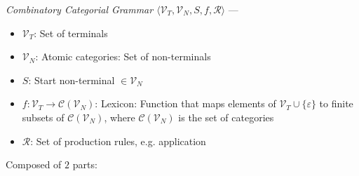 \emph{Combinatory Categorial Grammar $\langle \mathcal{V}_T, \mathcal{V}_N, S, f, \mathcal{R} \rangle$} --- 
\begin{itemize}
    \item $\mathcal{V}_T$: Set of terminals
    \item $\mathcal{V}_N$: Atomic categories: Set of non-terminals
    \item $S$: Start non-terminal $\in \mathcal{V}_N$
    \item $f: \mathcal{V}_T \to \mathcal{C}(\mathcal{V}_N)$: Lexicon: Function that maps elements of $\mathcal{V}_T \cup \{\varepsilon\}$ to finite subsets of $\mathcal{C}(\mathcal{V}_N)$, where $\mathcal{C}(\mathcal{V}_N)$ is the set of categories
    \item $\mathcal{R}$: Set of production rules, e.g. application
\end{itemize}
Composed of $2$ parts:
